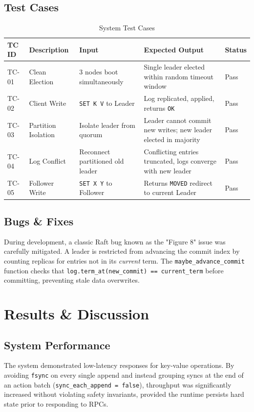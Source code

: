 \documentclass[12pt,a4paper]{report}
\begin{document}
\section{Test Cases}
\begin{table}[H]
\centering
\begin{tabularx}{\textwidth}{|l|X|X|X|l|}
\hline
\textbf{TC ID} & \textbf{Description} & \textbf{Input} & \textbf{Expected Output} & \textbf{Status} \\ \hline
TC-01 & Clean Election & 3 nodes boot simultaneously & Single leader elected within random timeout window & Pass \\ \hline
TC-02 & Client Write & \texttt{SET K V} to Leader & Log replicated, applied, returns \texttt{OK} & Pass \\ \hline
TC-03 & Partition Isolation & Isolate leader from quorum & Leader cannot commit new writes; new leader elected in majority & Pass \\ \hline
TC-04 & Log Conflict & Reconnect partitioned old leader & Conflicting entries truncated, logs converge with new leader & Pass \\ \hline
TC-05 & Follower Write & \texttt{SET X Y} to Follower & Returns \texttt{MOVED} redirect to current Leader & Pass \\ \hline
\end{tabularx}
\caption{System Test Cases}
\end{table}

\section{Bugs \& Fixes}
During development, a classic Raft bug known as the "Figure 8" issue was carefully mitigated. A leader is restricted from advancing the commit index by counting replicas for entries not in its \textit{current} term. The \texttt{maybe\_advance\_commit} function checks that \texttt{log.term\_at(new\_commit) == current\_term} before committing, preventing stale data overwrites.

\chapter{Results \& Discussion}

\section{System Performance}
The system demonstrated low-latency responses for key-value operations. By avoiding \texttt{fsync} on every single append and instead grouping syncs at the end of an action batch (\texttt{sync\_each\_append = false}), throughput was significantly increased without violating safety invariants, provided the runtime persists hard state prior to responding to RPCs.
\end{document}
